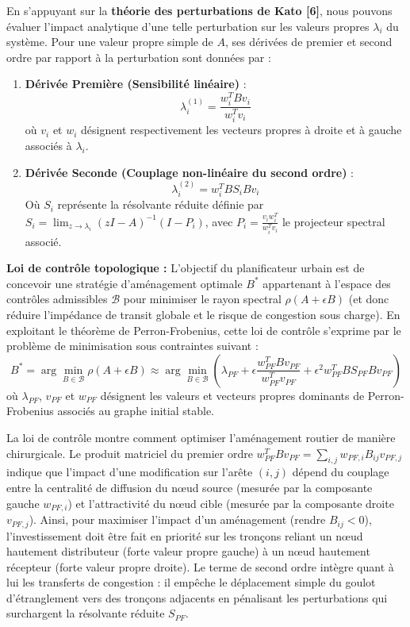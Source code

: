 \documentclass[10pt, a4paper]{article}
\begin{document}
En s'appuyant sur la \textbf{théorie des perturbations de Kato {[}6{]}},
nous pouvons évaluer l'impact analytique d'une telle perturbation sur
les valeurs propres \(\lambda_i\) du système. Pour une valeur propre
simple de \(A\), ses dérivées de premier et second ordre par rapport à
la perturbation sont données par :

\begin{enumerate}
\def\labelenumi{\arabic{enumi}.}
\item
  \textbf{Dérivée Première (Sensibilité linéaire)} :
  \[\lambda_i^{(1)} = \frac{w_i^T B v_i}{w_i^T v_i}\] où \(v_i\) et
  \(w_i\) désignent respectivement les vecteurs propres à droite et à
  gauche associés à \(\lambda_i\).
\item
  \textbf{Dérivée Seconde (Couplage non-linéaire du second ordre)} :
  \[\lambda_i^{(2)} = w_i^T B S_i B v_i\] Où \(S_i\) représente la
  résolvante réduite définie par
  \(S_i = \lim_{z \to \lambda_i} (zI - A)^{-1}(I - P_i)\), avec
  \(P_i = \frac{v_i w_i^T}{w_i^T v_i}\) le projecteur spectral associé.
\end{enumerate}

\textbf{Loi de contrôle topologique :} L'objectif du planificateur
urbain est de concevoir une stratégie d'aménagement optimale \(B^*\)
appartenant à l'espace des contrôles admissibles \(\mathcal{B}\) pour
minimiser le rayon spectral \(\rho(A + \epsilon B)\) (et donc réduire
l'impédance de transit globale et le risque de congestion sous charge).
En exploitant le théorème de Perron-Frobenius, cette loi de contrôle
s'exprime par le problème de minimisation sous contraintes suivant :
\[B^* = \arg\min_{B \in \mathcal{B}} \rho(A + \epsilon B) \approx \arg\min_{B \in \mathcal{B}} \left( \lambda_{PF} + \epsilon \frac{w_{PF}^T B v_{PF}}{w_{PF}^T v_{PF}} + \epsilon^2 w_{PF}^T B S_{PF} B v_{PF} \right)\]
où \(\lambda_{PF}\), \(v_{PF}\) et \(w_{PF}\) désignent les valeurs et
vecteurs propres dominants de Perron-Frobenius associés au graphe
initial stable.

La loi de contrôle montre comment optimiser l'aménagement routier de
manière chirurgicale. Le produit matriciel du premier ordre
\(w_{PF}^T B v_{PF} = \sum_{i,j} w_{PF, i} B_{ij} v_{PF, j}\) indique
que l'impact d'une modification sur l'arête \((i, j)\) dépend du
couplage entre la centralité de diffusion du nœud source (mesurée par la
composante gauche \(w_{PF, i}\)) et l'attractivité du nœud cible
(mesurée par la composante droite \(v_{PF, j}\)). Ainsi, pour maximiser
l'impact d'un aménagement (rendre \(B_{ij} < 0\)), l'investissement doit
être fait en priorité sur les tronçons reliant un nœud hautement
distributeur (forte valeur propre gauche) à un nœud hautement récepteur
(forte valeur propre droite). Le terme de second ordre intègre quant à
lui les transferts de congestion : il empêche le déplacement simple du
goulot d'étranglement vers des tronçons adjacents en pénalisant les
perturbations qui surchargent la résolvante réduite \(S_{PF}\).
\end{document}
